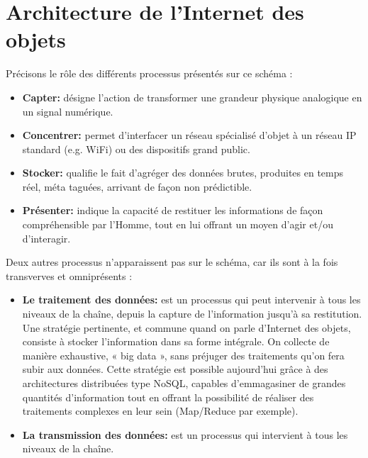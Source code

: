 \section{Architecture de l’Internet des objets}


Précisons le rôle des différents processus présentés sur ce schéma :
\begin{itemize}[label=\textbullet]
\item \textbf{Capter:} désigne l’action de transformer une grandeur physique analogique en un signal numérique.
\item \textbf{Concentrer:} permet d’interfacer un réseau spécialisé d’objet à un réseau IP standard (e.g. WiFi) ou des dispositifs grand public.
\item \textbf{Stocker:} qualifie le fait d’agréger des données brutes, produites en temps réel, méta taguées, arrivant de façon non prédictible.
\item \textbf{Présenter:} indique la capacité de restituer les informations de façon compréhensible par l’Homme, tout en lui offrant un moyen d’agir et/ou d’interagir.
\end{itemize}

Deux autres processus n’apparaissent pas sur le schéma, car ils sont à la fois transverves et omniprésents :
\begin{itemize}[label=\textbullet]
\item \textbf{Le traitement des données:} est un processus qui peut intervenir à tous les niveaux de la chaîne, depuis la capture de l’information jusqu’à sa restitution. Une stratégie pertinente, et commune quand on parle d’Internet des objets, consiste à stocker l’information dans sa forme intégrale. On collecte de manière exhaustive, « big data », sans préjuger des traitements qu’on fera subir aux données. Cette stratégie est possible aujourd’hui grâce à des architectures distribuées type NoSQL, capables d’emmagasiner de grandes quantités d’information tout en offrant la possibilité de réaliser des traitements complexes en leur sein (Map/Reduce par exemple).
\item \textbf{La transmission des données:} est un processus qui intervient à tous les niveaux de la chaîne.
\end{itemize}